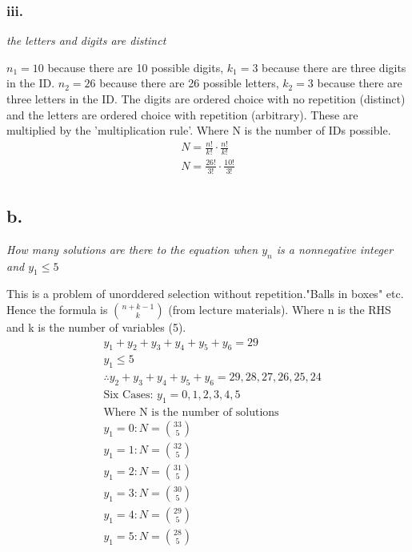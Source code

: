 \documentclass[a4paper, 12pt]{article}
\begin{document}
\subsubsection*{iii.}
\begin{center} \textit{the letters and digits are distinct} \end{center}
$n_1 = 10$ because there are 10 possible digits, $k_1=3$ because there are three digits in the ID.
$n_2 = 26$ because there are 26 possible letters, $k_2=3$ because there are three letters in the ID.
The digits are ordered choice with no repetition (distinct) and the letters are ordered choice with repetition (arbitrary).
These are multiplied by the 'multiplication rule'. Where N is the number of IDs possible.
\begin{align*}
    N = \frac{n!}{k!} \cdot \frac{n!}{k!}\\
    N = \frac{26!}{3!} \cdot \frac{10!}{3!} \\
\end{align*}
\newpage
\subsection*{b.}
\begin{center} \textit{How many solutions are there to the equation when $y_n$ is a nonnegative integer and $y_1 \leq 5$} \end{center}
This is a problem of unorddered selection without repetition."Balls in boxes" etc. Hence the formula is 
${n+k-1 \choose k}$ (from lecture materials). Where n is the RHS and k is the number of variables (5). 
\begin{align*}
    &y_1 + y_2 + y_3 + y_4 + y_5 + y_6  = 29 \\
    &y_1 \leq 5 \\
    &\therefore y_2 + y_3 + y_4 + y_5 + y_6 = 29, 28, 27, 26, 25, 24 \\
    &\text{Six Cases: } y_1 = 0, 1, 2, 3, 4, 5 \\
    &\text{Where N is the number of solutions} \\
    &y_1 = 0: N = {33 \choose 5} \\
    &y_1 = 1: N = {32 \choose 5} \\
    &y_1 = 2: N = {31 \choose 5} \\
    &y_1 = 3: N = {30 \choose 5} \\
    &y_1 = 4: N = {29 \choose 5} \\
    &y_1 = 5: N = {28 \choose 5} \\
\end{align*}
\end{document}
